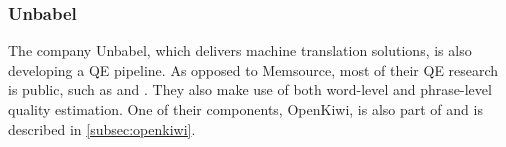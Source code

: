 \subsubsection{Unbabel}

The company Unbabel, which delivers machine translation solutions, is also developing a QE pipeline. As opposed to Memsource, most of their QE research is public, such as \cite{martins-unbabel:2016} and \cite{openkiwi}. They also make use of both word-level and phrase-level quality estimation. One of their components, OpenKiwi, is also part of \ptakopet{} and is described in \cref{subsec:openkiwi}.